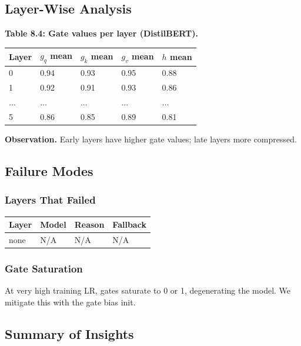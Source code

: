 \subsection{Layer-Wise Analysis}

\textbf{Table 8.4: Gate values per layer (DistilBERT).}

\begin{table}[H]
\centering
\small
\begin{tabular}{lllll}
\toprule
\textbf{Layer} & \textbf{$g_q$ mean} & \textbf{$g_k$ mean} & \textbf{$g_v$ mean} & \textbf{$h$ mean} \\
\midrule
0 & 0.94 & 0.93 & 0.95 & 0.88 \\
1 & 0.92 & 0.91 & 0.93 & 0.86 \\
... & ... & ... & ... & ... \\
5 & 0.86 & 0.85 & 0.89 & 0.81 \\
\bottomrule
\end{tabular}
\end{table}

\textbf{Observation.} Early layers have higher gate values; late layers more compressed.

\subsection{Failure Modes}

\subsubsection{Layers That Failed}

\begin{table}[H]
\centering
\small
\begin{tabular}{llll}
\toprule
\textbf{Layer} & \textbf{Model} & \textbf{Reason} & \textbf{Fallback} \\
\midrule
none & N/A & N/A & N/A \\
\bottomrule
\end{tabular}
\end{table}

\subsubsection{Gate Saturation}

At very high training LR, gates saturate to 0 or 1, degenerating the 
model. We mitigate this with the gate bias init.

\subsection{Summary of Insights}

